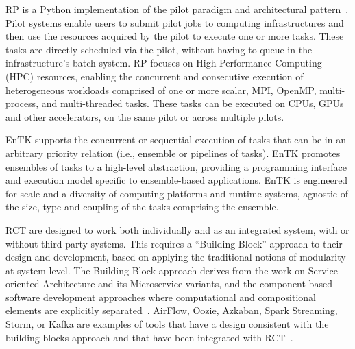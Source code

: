 \documentclass[preprint,12pt, a4paper]{elsarticle}
\begin{document}
RP is a Python implementation of the pilot paradigm and architectural
pattern~\cite{turilli2018comprehensive}. Pilot systems enable users to submit
pilot jobs to computing infrastructures and then use the resources acquired
by the pilot to execute one or more tasks. These tasks are directly scheduled
via the pilot, without having to queue in the infrastructure's batch system.
RP focuses on High Performance Computing (HPC) resources, enabling the
concurrent and consecutive execution of heterogeneous workloads comprised of
one or more scalar, MPI, OpenMP, multi-process, and multi-threaded tasks.
These tasks can be executed on CPUs, GPUs and other accelerators, on the same
pilot or across multiple pilots.

EnTK supports the concurrent or sequential execution of tasks that can be in
an arbitrary priority relation (i.e., ensemble or pipelines of tasks). EnTK
promotes ensembles of tasks to a high-level abstraction, providing a
programming interface and execution model specific to ensemble-based
applications. EnTK is engineered for scale and a diversity of computing
platforms and runtime systems, agnostic of the size, type and coupling of the
tasks comprising the ensemble.

RCT are designed to work both individually and as an integrated system, with
or without third party systems. This requires a ``Building Block'' approach
to their design and development, based on applying the traditional notions of
modularity at system level. The Building Block approach derives from the work
on Service-oriented Architecture and its Microservice variants, and the
component-based software development approaches where computational and
compositional elements are explicitly
separated~\cite{batory1992design,garlan1995architectural,lenz1988software,clemens1998component,schneider2000components}.
AirFlow, Oozie, Azkaban, Spark Streaming, Storm, or Kafka are examples of
tools that have a design consistent with the building blocks approach and
that have been integrated with RCT~\cite{turilli2019middleware}.

\end{document}
